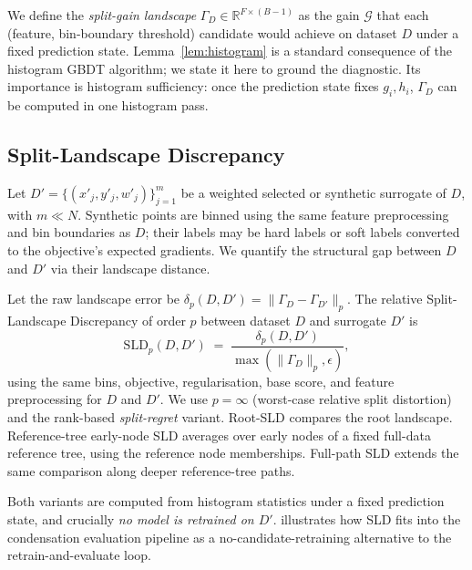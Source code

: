 \noindent We define the \emph{split-gain landscape}
$\Gamma_D \in \mathbb{R}^{F \times (B-1)}$ as the gain $\mathcal{G}$ that each
(feature, bin-boundary threshold) candidate would achieve on dataset $D$ under a
fixed prediction state. Lemma~\ref{lem:histogram} is a standard consequence of
the histogram GBDT algorithm; we state it here to ground the diagnostic. Its
importance is histogram sufficiency: once the prediction state fixes
$g_i,h_i$, $\Gamma_D$ can be computed in one histogram pass.

\subsection{Split-Landscape Discrepancy}

Let $D'=\{(x'_j,y'_j,w'_j)\}_{j=1}^m$ be a weighted selected or synthetic
surrogate of $D$, with $m \ll N$. Synthetic points are binned using the same
feature preprocessing and bin boundaries as $D$; their labels may be hard labels
or soft labels converted to the objective's expected gradients. We quantify the
structural gap between $D$ and $D'$ via their landscape distance.

\begin{definition}
\label{def:sld}
Let the raw landscape error be
$\delta_p(D,D')=\lVert\Gamma_D-\Gamma_{D'}\rVert_p$. The relative
Split-Landscape Discrepancy of order $p$ between dataset $D$ and surrogate $D'$
is
%
\begin{equation}
  \label{eq:sld}
  \mathrm{SLD}_p(D, D') \;=\;
  \frac{\delta_p(D,D')}
       {\max(\lVert \Gamma_D\rVert_p,\epsilon)},
\end{equation}
%
using the same bins, objective, regularisation, base score, and feature
preprocessing for $D$ and $D'$. We use $p = \infty$ (worst-case relative split
distortion) and the rank-based \emph{split-regret} variant. Root-SLD compares
the root landscape. Reference-tree early-node SLD averages over early nodes of a
fixed full-data reference tree, using the reference node memberships. Full-path
SLD extends the same comparison along deeper reference-tree paths.
\end{definition}

\noindent Both variants are computed from histogram statistics under a fixed
prediction state, and crucially \emph{no model is retrained on $D'$}.
 illustrates how SLD fits into the condensation evaluation
pipeline as a no-candidate-retraining alternative to the retrain-and-evaluate
loop.

